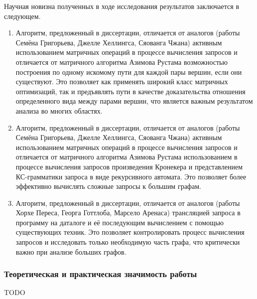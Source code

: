 Научная новизна полученных в ходе исследования результатов заключается в следующем.

\begin{enumerate}

\item Алгоритм, предложенный в диссертации, отличается от аналогов (работы Семёна Григорьева, Джелле Хеллингса, Сяованга Чжана) активным использованием матричных операций в процессе вычисления запросов и отличается от матричного алгоритма Азимова Рустама возможностью построения по одному искомому пути для каждой пары вершин, если они существуют. Это позволяет как применять широкий класс матричных оптимизаций, так и предъявлять пути в качестве доказательства отношения определенного вида между парами вершин, что является важным результатом анализа во многих областях.

\item Алгоритм, предложенный в диссертации, отличается от аналогов (работы Семёна Григорьева, Джелле Хеллингса, Сяованга Чжана) активным использованием матричных операций в процессе вычисления запросов и отличается от матричного алгоритма Азимова Рустама использованием в процессе вычисления запросов произведения Кронекера и представлением КС-грамматики запроса в виде рекурсивного автомата. Это позволяет более эффективно вычислять сложные запросы к большим графам.

\item Алгоритм, предложенный в диссертации, отличается от аналогов (работы Хорхе Переса, Георга Готтлоба, Марсело Аренаса) трансляцией запроса в программу на даталоге и её последующим вычислением с помощью существующих техник. Это позволяет контролировать процесс вычисления запросов и исследовать только необходимую часть графа, что критически важно при анализе больших графов.

\end{enumerate}

\subsubsection*{\large{Теоретическая и практическая значимость работы}}
TODO


